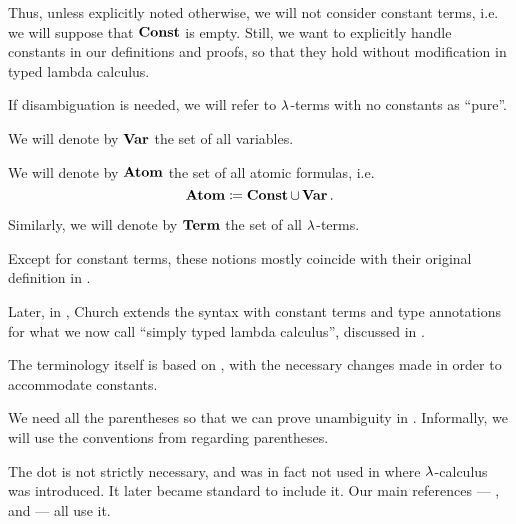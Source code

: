 \begin{definition}
\begin{thmenum}
    Thus, unless explicitly noted otherwise, we will not consider constant terms, i.e. we will suppose that \( \op*{Const} \) is empty. Still, we want to explicitly handle constants in our definitions and proofs, so that they hold without modification in typed lambda calculus.

    If disambiguation is needed, we will refer to \( \mathrm{\lambda} \)-terms with no constants as \enquote{pure}.

     We will denote by \( \op*{Var} \) the set of all variables.

     We will denote by \( \op*{Atom} \) the set of all atomic formulas, i.e.
    \begin{equation*}
      \op*{Atom} \coloneqq \op*{Const} \cup \op*{Var}.
    \end{equation*}

     Similarly, we will denote by \( \op*{Term} \) the set of all \( \mathrm{\lambda} \)-terms.
  \end{thmenum}
\end{definition}
\begin{comments}
  \item Except for constant terms, these notions mostly coincide with their original definition in \cite[352]{Church1932Untyped}.

  Later, in \cite[56]{Church1940STT}, Church extends the syntax with constant terms and type annotations for what we now call \enquote{simply typed lambda calculus}, discussed in .

  The terminology itself is based on \cite[def. 1A1]{Hindley1997STT}, with the necessary changes made in order to accommodate constants.

  \item We need all the parentheses so that we can prove unambiguity in . Informally, we will use the conventions from  regarding parentheses.

  \item The dot is not strictly necessary, and was in fact not used in  where \( \mathrm{\lambda} \)-calculus was introduced. It later became standard to include it. Our main references --- ,  and  --- all use it.
\end{comments}

